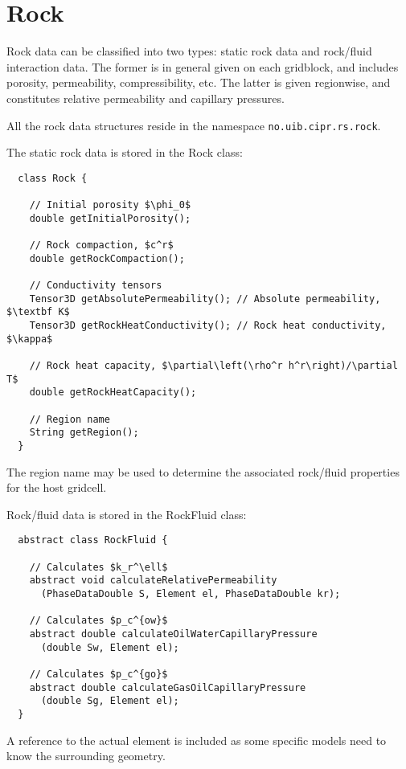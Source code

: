 \chapter{Rock}
\label{chap:rock}

\minitoc

Rock data can be classified into two types: static rock data and
rock/fluid interaction data. The former is in general given on each
gridblock, and includes porosity, permeability, compressibility, etc.
The latter is given regionwise, and constitutes relative permeability
and capillary pressures.

All the rock data structures reside in the namespace
\texttt{no.uib.cipr.rs.rock}.



The static rock data is stored in the Rock class:
\begin{lstlisting}
  class Rock {

    // Initial porosity $\phi_0$
    double getInitialPorosity();

    // Rock compaction, $c^r$
    double getRockCompaction();

    // Conductivity tensors
    Tensor3D getAbsolutePermeability(); // Absolute permeability, $\textbf K$
    Tensor3D getRockHeatConductivity(); // Rock heat conductivity, $\kappa$

    // Rock heat capacity, $\partial\left(\rho^r h^r\right)/\partial T$
    double getRockHeatCapacity();

    // Region name
    String getRegion();
  }
\end{lstlisting}
The region name may be used to determine the associated rock/fluid
properties for the host gridcell.



Rock/fluid data is stored in the RockFluid class:
\begin{lstlisting}
  abstract class RockFluid {

    // Calculates $k_r^\ell$
    abstract void calculateRelativePermeability
      (PhaseDataDouble S, Element el, PhaseDataDouble kr);

    // Calculates $p_c^{ow}$
    abstract double calculateOilWaterCapillaryPressure
      (double Sw, Element el);

    // Calculates $p_c^{go}$
    abstract double calculateGasOilCapillaryPressure
      (double Sg, Element el);
  }
\end{lstlisting}
A reference to the actual element is included as some specific models
need to know the surrounding geometry.

